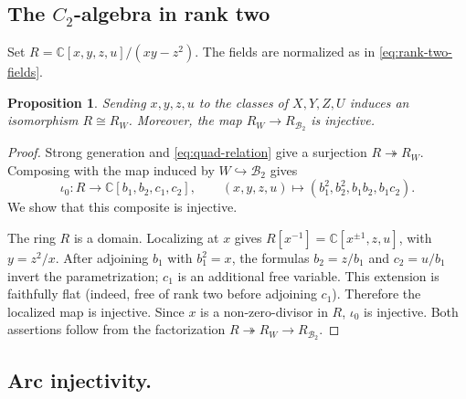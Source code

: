 \documentclass[11pt]{amsart}
\newtheorem{proposition}[theorem]{Proposition}
\theoremstyle{definition}
\theoremstyle{remark}
\newcommand{\C}{\mathbb C}
\newcommand{\B}{\mathcal B}
\begin{document}
\subsection{The \texorpdfstring{$C_2$}{C2}-algebra in rank two}

Set $R=\C[x,y,z,u]/(xy-z^2)$. The fields are normalized as in
\eqref{eq:rank-two-fields}.

\begin{proposition}\label{prop:c2}
Sending $x,y,z,u$ to the classes of $X,Y,Z,U$ induces an isomorphism
$R\cong R_{W}$. Moreover, the map $R_{W}\to R_{\B_2}$ is
injective.
\end{proposition}
\begin{proof}
Strong generation and \eqref{eq:quad-relation} give a surjection
$R\twoheadrightarrow R_{W}$. Composing with the map induced by
$W\hookrightarrow\B_2$ gives
\begin{equation}\label{eq:parametrization}
 \iota_0:R\longrightarrow\C[b_1,b_2,c_1,c_2],\qquad
 (x,y,z,u)\longmapsto(b_1^2,b_2^2,b_1b_2,b_1c_2).
\end{equation}
We show that this composite is injective.

The ring $R$ is a domain. Localizing at $x$ gives
$R[x^{-1}]=\C[x^{\pm1},z,u]$, with $y=z^2/x$.
After adjoining $b_1$ with $b_1^2=x$, the formulas
$b_2=z/b_1$ and $c_2=u/b_1$ invert the parametrization; $c_1$
is an additional free variable. This extension is faithfully flat
(indeed, free of rank two before adjoining $c_1$). Therefore the
localized map is injective. Since $x$ is a non-zero-divisor in $R$,
$\iota_0$ is injective. Both assertions follow from the factorization
$R\twoheadrightarrow R_{W}\to R_{\B_2}$.
\end{proof}

\subsection{Arc injectivity.}
\end{document}
